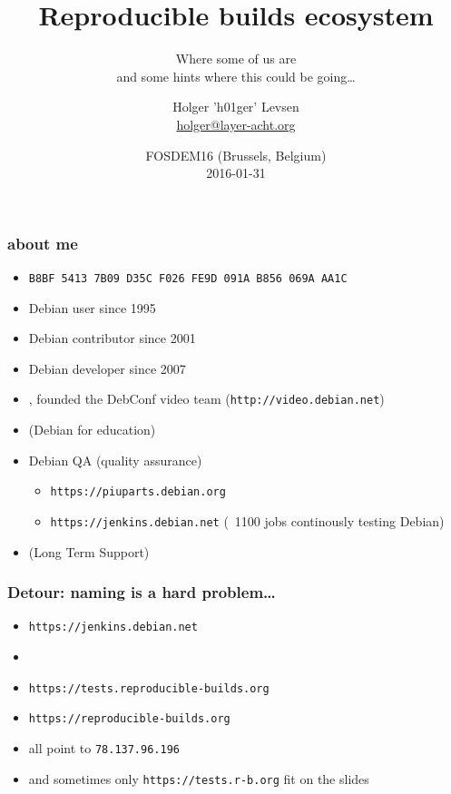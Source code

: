\documentclass[14pt]{beamer}
\title[Reproducible builds ecosystem]{Reproducible builds ecosystem}
\subtitle{Where some of us are \\
and some hints where this could be going…}
\author[h01ger]{%
   \texorpdfstring{
            \centering
            Holger 'h01ger' Levsen\\
            \href{mailto:holger@layer-acht.org}{holger@layer-acht.org}
   }{h01ger}}
\institute[Debian]{}
\date[FOSDEM16]{%
 FOSDEM16 (Brussels, Belgium)\\
 \small{2016-01-31}}
\begin{document}
\begin{frame}[plain]
 \titlepage
\end{frame}

\begin{frame}
 \frametitle{about me}

 \begin{itemize}
  \item \small{\texttt{B8BF 5413 7B09 D35C F026  FE9D 091A B856 069A AA1C}}
  \item Debian user since 1995
  \item Debian contributor since 2001
  \item Debian developer since 2007
  \item {},
  founded the DebConf video team (\texttt{http://video.debian.net})
  \item {} (Debian for education)
  \item Debian QA (quality assurance)
  \begin{itemize}
   \item \texttt{https://piuparts.debian.org}
   \item \texttt{https://jenkins.debian.net} (~1100 jobs continously testing Debian)
  \end{itemize}
  \item {} (Long Term Support)
 \end{itemize}
\end{frame}

\begin{frame}
 \frametitle{Detour: naming is a hard problem…}
 \begin{itemize}
 \item \texttt{https://jenkins.debian.net}
 \item {}
 \item \texttt{https://tests.reproducible-builds.org}
 \item \texttt{https://reproducible-builds.org}
 \item<2-3> all point to \texttt{78.137.96.196}
 \item<3> \small{and sometimes only \texttt{https://tests.r-b.org} fit on the slides}
 \end{itemize}
\end{frame}
\end{document}
